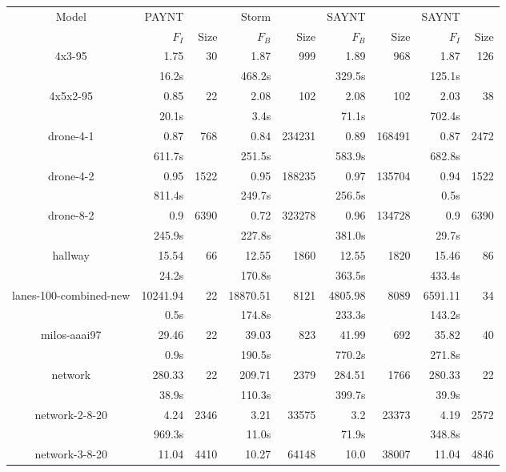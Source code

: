 \documentclass{article}
\begin{document}
\begin{table}
\begin{tabular}{|c|rr|rr|rr|rr|}
\hline

Model & PAYNT & & Storm & & SAYNT & & SAYNT & \\ 

 & $F_{I}$ & Size & $F_{B}$ & Size & $F_{B}$ & Size & $F_{I}$ & Size \\ \hline 

4x3-95 & 1.75 & 30 & 1.87 & 999 & 1.89 & 968 & 1.87 & 126 \\
 & 16.2s & & 468.2s & & 329.5s & & 125.1s & \\
\hline
4x5x2-95 & 0.85 & 22 & 2.08 & 102 & 2.08 & 102 & 2.03 & 38 \\
 & 20.1s & & 3.4s & & 71.1s & & 702.4s & \\
\hline
drone-4-1 & 0.87 & 768 & 0.84 & 234231 & 0.89 & 168491 & 0.87 & 2472 \\
 & 611.7s & & 251.5s & & 583.9s & & 682.8s & \\
\hline
drone-4-2 & 0.95 & 1522 & 0.95 & 188235 & 0.97 & 135704 & 0.94 & 1522 \\
 & 811.4s & & 249.7s & & 256.5s & & 0.5s & \\
\hline
drone-8-2 & 0.9 & 6390 & 0.72 & 323278 & 0.96 & 134728 & 0.9 & 6390 \\
 & 245.9s & & 227.8s & & 381.0s & & 29.7s & \\
\hline
hallway & 15.54 & 66 & 12.55 & 1860 & 12.55 & 1820 & 15.46 & 86 \\
 & 24.2s & & 170.8s & & 363.5s & & 433.4s & \\
\hline
lanes-100-combined-new & 10241.94 & 22 & 18870.51 & 8121 & 4805.98 & 8089 & 6591.11 & 34 \\
 & 0.5s & & 174.8s & & 233.3s & & 143.2s & \\
\hline
milos-aaai97 & 29.46 & 22 & 39.03 & 823 & 41.99 & 692 & 35.82 & 40 \\
 & 0.9s & & 190.5s & & 770.2s & & 271.8s & \\
\hline
network & 280.33 & 22 & 209.71 & 2379 & 284.51 & 1766 & 280.33 & 22 \\
 & 38.9s & & 110.3s & & 399.7s & & 39.9s & \\
\hline
network-2-8-20 & 4.24 & 2346 & 3.21 & 33575 & 3.2 & 23373 & 4.19 & 2572 \\
 & 969.3s & & 11.0s & & 71.9s & & 348.8s & \\
\hline
network-3-8-20 & 11.04 & 4410 & 10.27 & 64148 & 10.0 & 38007 & 11.04 & 4846 \\

\end{tabular}
\end{table}
\end{document}
